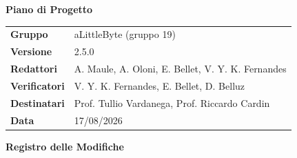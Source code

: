 \documentclass[a4paper,12pt]{article}
\begin{document}
\thispagestyle{firstpage}

\vspace*{0.5cm}

\begin{center}
    {\LARGE \textbf{Piano di Progetto}}
\end{center}

\vspace{1.5cm}

\begin{center}
    \renewcommand{\arraystretch}{1.3}
    \begin{tcolorbox}[
        width=0.92\textwidth,
        colback=gray!6,
        colframe=gray!45,
        boxrule=0.5pt,
        arc=2mm,
        boxsep=0pt,
        left=8pt, right=8pt, top=8pt, bottom=8pt
    ]
        \begin{tabularx}{\linewidth}{>{\bfseries}p{3.5cm} X}
            Gruppo      & aLittleByte (gruppo 19) \\
            Versione & 2.5.0 \\
            Redattori   & A. Maule, A. Oloni, E. Bellet, V. Y. K. Fernandes \\
            Verificatori &  V. Y. K. Fernandes, E. Bellet, D. Belluz \\
            Destinatari & Prof. Tullio Vardanega, Prof. Riccardo Cardin \\
            Data        & 17/08/2026
        \end{tabularx}
    \end{tcolorbox}
\end{center}

\newpage
{}

\begin{center}
    {\Large \textbf{Registro delle Modifiche}}
\end{center}

\vspace{0.35cm}
\renewcommand{\arraystretch}{1.35}
\end{document}

